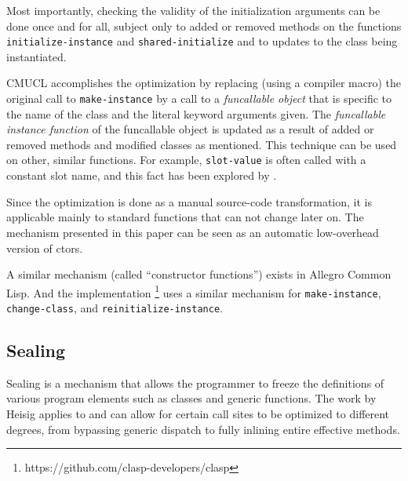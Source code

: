 Most importantly, checking the validity of the initialization
arguments can be done once and for all, subject only to added or
removed methods on the functions \texttt{initialize-instance} and
\texttt{shared-initialize} and to updates to the class being
instantiated.

CMUCL accomplishes the optimization by replacing (using a compiler
macro) the original call to \texttt{make-instance} by a call to a
\emph{funcallable object} that is specific to the name of the class
and the literal keyword arguments given.  The \emph{funcallable
  instance function} of the funcallable object is updated as a result
of added or removed methods and modified classes as mentioned.
This technique can be used on other, similar functions.  For example,
\texttt{slot-value} is often called with a constant slot name, and
this fact has been explored by \sbcl{}.

Since the optimization is done as a manual source-code transformation,
it is applicable mainly to standard functions that can not change later
on.  The mechanism presented in this paper can be seen as an automatic
low-overhead version of ctors.

A similar mechanism (called ``constructor functions'') exists in
Allegro Common Lisp.  And the \clasp{} \commonlisp{} implementation%
\footnote{https://github.com/clasp-developers/clasp}
uses a similar mechanism for \texttt{make-instance},
\texttt{change-class}, and \texttt{reinitialize-instance}.

\subsection{Sealing}

Sealing is a mechanism that allows the programmer to freeze the
definitions of various program elements such as classes and generic
functions.  The work by Heisig \cite{Heisig:2020:ELS:Sealable} applies
to \commonlisp{} and can allow for certain call sites to be
optimized to different degrees, from bypassing generic dispatch to
fully inlining entire effective methods.

